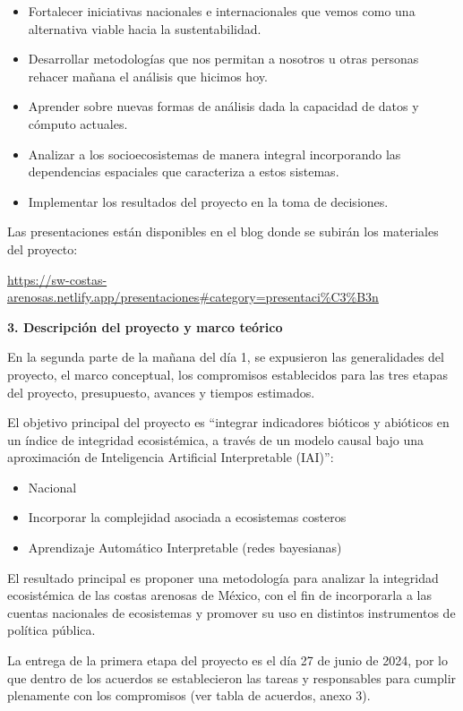 \documentclass[
  letterpaper,
  DIV=11,
  numbers=noendperiod]{scrreprt}
\providecommand{\tightlist}{%
  \setlength{\itemsep}{0pt}\setlength{\parskip}{0pt}}\usepackage{longtable,booktabs,array}
\begin{document}
\begin{itemize}
\item
  Fortalecer iniciativas nacionales e internacionales que vemos como una
  alternativa viable hacia la sustentabilidad.
\item
  Desarrollar metodologías que nos permitan a nosotros u otras personas
  rehacer mañana el análisis que hicimos hoy.
\item
  Aprender sobre nuevas formas de análisis dada la capacidad de datos y
  cómputo actuales.
\item
  Analizar a los socioecosistemas de manera integral incorporando las
  dependencias espaciales que caracteriza a estos sistemas.
\item
  Implementar los resultados del proyecto en la toma de decisiones.
\end{itemize}

Las presentaciones están disponibles en el blog donde se subirán los
materiales del proyecto:~

\url{https://sw-costas-arenosas.netlify.app/presentaciones\#category=presentaci\%C3\%B3n}

\textbf{3. Descripción del proyecto y marco teórico}

En la segunda parte de la mañana del día 1, se expusieron las
generalidades del proyecto, el marco conceptual, los compromisos
establecidos para las tres etapas del proyecto, presupuesto, avances y
tiempos estimados.

El objetivo principal del proyecto es ``integrar indicadores bióticos y
abióticos en un índice de integridad ecosistémica, a través de un modelo
causal bajo una aproximación de Inteligencia Artificial Interpretable
(IAI)'':

\begin{itemize}
\tightlist
\item
  Nacional
\item
  Incorporar la complejidad asociada a ecosistemas costeros
\item
  Aprendizaje Automático Interpretable (redes bayesianas)
\end{itemize}

El resultado principal es proponer una metodología para analizar la
integridad ecosistémica de las costas arenosas de México, con el fin de
incorporarla a las cuentas nacionales de ecosistemas y promover su uso
en distintos instrumentos de política pública.

La entrega de la primera etapa del proyecto es el día 27 de junio de
2024, por lo que dentro de los acuerdos se establecieron las tareas y
responsables para cumplir plenamente con los compromisos (ver tabla de
acuerdos, anexo 3).
\end{document}
